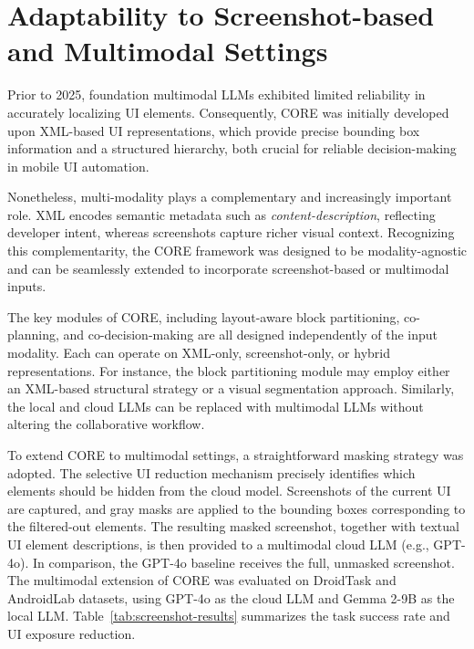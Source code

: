 \section{Adaptability to Screenshot-based and Multimodal Settings}
\label{sec:appendix-multimodal}

Prior to 2025, foundation multimodal LLMs exhibited limited reliability in accurately localizing UI elements. Consequently, CORE was initially developed upon XML-based UI representations, which provide precise bounding box information and a structured hierarchy, both crucial for reliable decision-making in mobile UI automation.

Nonetheless, multi-modality plays a complementary and increasingly important role. XML encodes semantic metadata such as \textit{content-description}, reflecting developer intent, whereas screenshots capture richer visual context. Recognizing this complementarity, the CORE framework was designed to be modality-agnostic and can be seamlessly extended to incorporate screenshot-based or multimodal inputs.

The key modules of CORE, including layout-aware block partitioning, co-planning, and co-decision-making are all designed independently of the input modality. Each can operate on XML-only, screenshot-only, or hybrid representations. For instance, the block partitioning module may employ either an XML-based structural strategy or a visual segmentation approach. Similarly, the local and cloud LLMs can be replaced with multimodal LLMs without altering the collaborative workflow.

To extend CORE to multimodal settings, a straightforward masking strategy was adopted. The selective UI reduction mechanism precisely identifies which elements should be hidden from the cloud model. Screenshots of the current UI are captured, and gray masks are applied to the bounding boxes corresponding to the filtered-out elements. The resulting masked screenshot, together with textual UI element descriptions, is then provided to a multimodal cloud LLM (e.g., GPT-4o). In comparison, the GPT-4o baseline receives the full, unmasked screenshot. The multimodal extension of CORE was evaluated on DroidTask and AndroidLab datasets, using GPT-4o as the cloud LLM and Gemma 2-9B as the local LLM. Table~\ref{tab:screenshot-results} summarizes the task success rate and UI exposure reduction.

